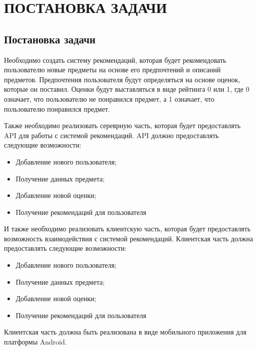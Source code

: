 \chapter{ПОСТАНОВКА ЗАДАЧИ}
\section{Постановка задачи}

Необходимо создать систему рекомендаций, которая будет рекомендовать пользователю новые предметы на основе его
предпочтений и описаний предметов.
Предпочтения пользователя будут определяться на основе оценок, которые он поставил.
Оценки будут выставляться в виде рейтинга 0 или 1, где 0 означает, что пользователю не понравился предмет,
а 1 означает, что пользователю понравился предмет.

Также необходимо реализовать сереврную часть, которая будет предоставлять API для работы с системой рекомендаций.
API должно предоставлять следующие возможности:
\begin{itemize}
    \item Добавление нового пользователя;
    \item Получение данных предмета;
    \item Добавление новой оценки;
    \item Получение рекомендаций для пользователя
\end{itemize}

И также необходимо реализовать клиентскую часть, которая будет предоставлять возможность взаимодействия с системой
рекомендаций.
Клиентская часть должна предоставлять следующие возможности:
\begin{itemize}
    \item Добавление нового пользователя;
    \item Получение данных предмета;
    \item Добавление новой оценки;
    \item Получение рекомендаций для пользователя
\end{itemize}

Клиентская часть должна быть реализована в виде мобильного приложения для платформы Android.